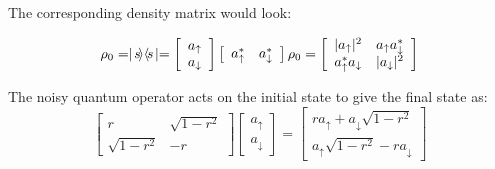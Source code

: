 \documentclass[english]{article}
\DeclarePairedDelimiter\abs{\lvert}{\rvert}
\begin{document}
The corresponding density matrix would look:

\begin{eqnarray}
  \rho_{0} = \mid\!s\!\rangle \langle\!s\!\mid = \left[\begin{array}{c} a_{\uparrow}\\ a_{\downarrow}\end{array}\right] \left[\begin{array}{c}a_{\uparrow}^{*}\quad a_{\downarrow}^{*}\end{array} \right]
\rho_{0}  = \left[\begin{array}{cc}\abs{a_{\uparrow}}^{2} & a_{\uparrow}a_{\downarrow}^{*} \\
               a_{\uparrow}^{*}a_{\downarrow} & \abs{a_{\downarrow}}^{2}
    \end{array} \right]
\end{eqnarray}


The noisy quantum operator acts on the initial state to give the final state as:
$$
\left[\begin{array}{cc} r & \sqrt{1 - r^{2}} \\\sqrt{1 - r^{2}} & -r \end{array}\right] \left[\begin{array}{c} a_{\uparrow} \\ a_{\downarrow} \end{array}\right] = \left[\begin{array}{c}ra_{\uparrow} + a_{\downarrow}\sqrt{1 - r^{2}} \\ a_{\uparrow}\sqrt{1 - r^{2}} - ra_{\downarrow} \end{array}\right]
$$
\end{document}
